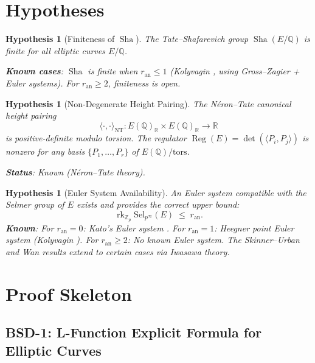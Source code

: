\documentclass[11pt]{article}
\newtheorem{hypothesis}[lemma]{Hypothesis}
\theoremstyle{definition}
\DeclareMathOperator{\rk}{rk}
\DeclareMathOperator{\Reg}{Reg}
\DeclareMathOperator{\Sha}{Sha}
\begin{document}
\section{Hypotheses}

\begin{hypothesis}[Finiteness of $\Sha$]
\label{hyp:sha-finite}
The Tate--Shafarevich group $\Sha(E/\mathbb{Q})$ is finite for all elliptic curves $E/\mathbb{Q}$.

\textbf{Known cases}: $\Sha$ is finite when $r_{\mathrm{an}} \leq 1$
(Kolyvagin \cite{Koly}, using Gross--Zagier + Euler systems).
For $r_{\mathrm{an}} \geq 2$, finiteness is open.
\end{hypothesis}

\begin{hypothesis}[Non-Degenerate Height Pairing]
\label{hyp:height}
The N\'eron--Tate canonical height pairing
\[
  \langle \cdot, \cdot \rangle_{\mathrm{NT}} : E(\mathbb{Q})_{\mathbb{R}} \times E(\mathbb{Q})_{\mathbb{R}} \to \mathbb{R}
\]
is positive-definite modulo torsion.  The regulator $\Reg(E) = \det(\langle P_i, P_j \rangle)$
is nonzero for any basis $\{P_1, \ldots, P_r\}$ of $E(\mathbb{Q}) / \mathrm{tors}$.

\textbf{Status}: Known (N\'eron--Tate theory).
\end{hypothesis}

\begin{hypothesis}[Euler System Availability]
\label{hyp:euler}
An Euler system compatible with the Selmer group of $E$ exists and provides
the correct upper bound:
\[
  \rk_{\mathbb{Z}_p} \mathrm{Sel}_{p^\infty}(E) \;\leq\; r_{\mathrm{an}}.
\]
\textbf{Known}: For $r_{\mathrm{an}} = 0$: Kato's Euler system \cite{Kato}.
For $r_{\mathrm{an}} = 1$: Heegner point Euler system (Kolyvagin \cite{Koly}).
For $r_{\mathrm{an}} \geq 2$: No known Euler system.
The Skinner--Urban \cite{SU} and Wan \cite{Wan} results extend to certain cases
via Iwasawa theory.
\end{hypothesis}

\section{Proof Skeleton}

\subsection{BSD-1: L-Function Explicit Formula for Elliptic Curves}
\end{document}
